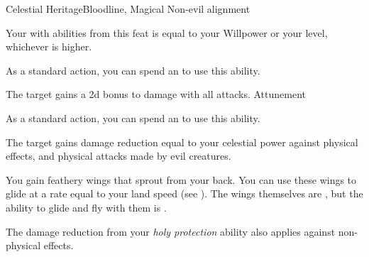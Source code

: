     \begin{feat}{Celestial Heritage}{Bloodline, Magical}
        \featpre Non-evil alignment
        \featben

         Your  with abilities from this feat is equal to your Willpower or your level, whichever is higher.

         As a standard action, you can spend an  to use this ability.
        \begin{ability}
            \begin{spelltargetinginfo}
            \end{spelltargetinginfo}
            \begin{spelleffects}
                \spelleffect The target gains a \plus2d bonus to damage with all attacks.
                \spelldur Attunement
            \end{spelleffects}
        \end{ability}

         As a standard action, you can spend an  to use this ability.
        \begin{ability}
            \begin{spelltargetinginfo}
            \end{spelltargetinginfo}
            \begin{spelleffects}
                \spelleffect The target gains damage reduction equal to your celestial power against  physical effects, and physical attacks made by evil creatures.
            \end{spelleffects}
        \end{ability}

         You gain feathery wings that sprout from your back.
        You can use these wings to glide at a rate equal to your land speed (see ).
        The wings themselves are , but the ability to glide and fly with them is .

         The damage reduction from your \textit{holy protection} ability also applies against non-physical effects.


\end{feat}
